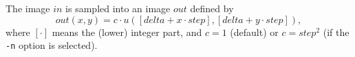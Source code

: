 The image $in$ is sampled into an image $out$ defined by
$$out(x,y) = c\cdot u([delta +x\cdot step],[delta +y\cdot step]),$$
where $[\cdot]$ means the (lower) integer part, and $c=1$ (default) or
$c=step^2$ (if the \verb+-n+ option is selected).
